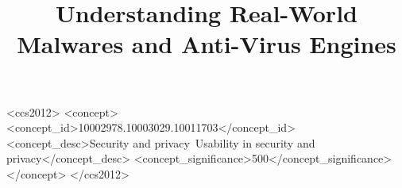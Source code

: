 \documentclass[sigconf, anonymous]{acmart}
\begin{document}
\title{Understanding Real-World Malwares and Anti-Virus Engines}%

\begin{abstract}

\end{abstract}

\begin{CCSXML}
<ccs2012>
<concept>
<concept_id>10002978.10003029.10011703</concept_id>
<concept_desc>Security and privacy~Usability in security and privacy</concept_desc>
<concept_significance>500</concept_significance>
</concept>
</ccs2012>
\end{CCSXML}



\maketitle







%





\end{document}
